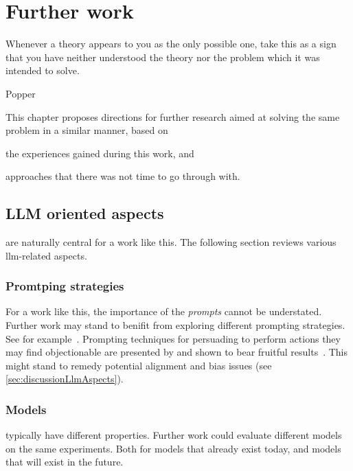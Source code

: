 \chapter{Further work}\label{chp:furtherWork}

\epigraph{Whenever a theory appears to you as the only possible one, take this as a sign that you have neither understood the theory nor the problem which it was intended to solve.}{Popper}

This chapter proposes directions for further research aimed at solving the same problem in a similar
manner, based on \begin{inparaenum}
    \item the experiences gained during this work, and
    \item approaches that there was not time to go through with.
\end{inparaenum}

\section{LLM oriented aspects}

 are naturally central for a work like this. The following
section reviews various \acrshort{llm}-related aspects.

\subsection{Promtping strategies}

For a work like this, the importance of the \emph{prompts} cannot be understated. Further work may
stand to benifit from exploring different prompting strategies. See for
example~\cite{girayPromptEngineering23}. Prompting techniques for persuading  to
perform actions they may find objectionable are presented by \citeauthor{meincke2025overtale} and
shown to bear fruitful results~\cite[1]{meincke2025overtale}. This might stand to remedy potential
alignment and bias issues (see \cref{sec:discussionLlmAspects}).

\subsection{Models}

 typically have different properties. Further work could evaluate different models
on the same experiments. Both for models that already exist today, and models that will exist in the future.

